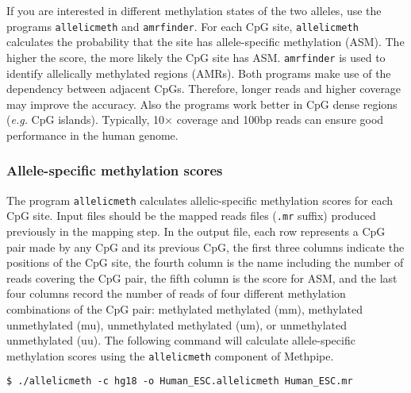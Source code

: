 \documentclass[10pt]{article}
\newcommand{\prog}[1]{\texttt{#1}}
\newcommand{\fn}[1]{\texttt{#1}}
\begin{document}
If you are interested in different methylation states of the two
alleles, use the programs \prog{allelicmeth} and \prog{amrfinder}. For
each CpG site, \prog{allelicmeth} calculates the probability that the
site has allele-specific methylation (ASM). The higher the score, the
more likely the CpG site has ASM. \prog{amrfinder} is used to identify
allelically methylated regions (AMRs). Both programs make use of the
dependency between adjacent CpGs. Therefore, longer reads and higher
coverage may improve the accuracy. Also the programs work better in
CpG dense regions ({\em e.g.} CpG islands). Typically, 10$\times$
coverage and 100bp reads can ensure good performance in the human
genome.

\subsubsection{Allele-specific methylation scores}
\label{sec:allelic_scores}

The program \prog{allelicmeth} calculates allelic-specific methylation
scores for each CpG site. Input files should be the mapped reads files
(\fn{.mr} suffix) produced previously in the mapping step. In the
output file, each row represents a CpG pair made by any CpG and its
previous CpG, the first three columns indicate the positions of the
CpG site, the fourth column is the name including the number of reads
covering the CpG pair, the fifth column is the score for ASM, and the
last four columns record the number of reads of four different
methylation combinations of the CpG pair: methylated methylated (mm),
methylated unmethylated (mu), unmethylated methylated (um), or
unmethylated unmethylated (uu). The following command will calculate
allele-specific methylation scores using the \prog{allelicmeth}
component of Methpipe.
\begin{verbatim}
$ ./allelicmeth -c hg18 -o Human_ESC.allelicmeth Human_ESC.mr
\end{verbatim}
\end{document}
